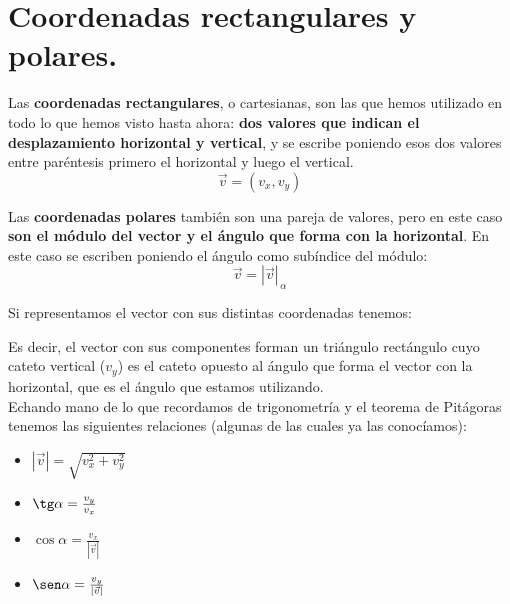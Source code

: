 \documentclass[a4paper,11pt,answers]{exam}
\begin{document}
\section{Coordenadas rectangulares y polares.}
Las \textbf{coordenadas rectangulares}, o cartesianas, son las que hemos utilizado en todo lo que hemos
visto hasta ahora: \textbf{dos valores que indican el desplazamiento horizontal y vertical}, y se
escribe poniendo esos dos valores entre paréntesis primero el horizontal y luego el vertical.
\[\vec{v} = (v_x, v_y)\]

Las \textbf{coordenadas polares} también son una pareja de valores, pero en este caso
\textbf{son el módulo del vector y el ángulo que forma con la horizontal}. En este caso se escriben
poniendo el ángulo como subíndice del módulo:
\Large{\[\vec{v} = |\vec{v}|_{\,\alpha}\]}

Si representamos el vector con sus distintas coordenadas tenemos:
\begin{center}
\end{center}
Es decir, el vector con sus componentes forman un triángulo rectángulo cuyo cateto vertical ($v_y$)
es el cateto opuesto al ángulo que forma el vector con la horizontal, que es el ángulo que estamos
utilizando.\\
Echando mano de lo que recordamos de trigonometría y el teorema de Pitágoras tenemos las siguientes
relaciones (algunas de las cuales ya las conocíamos):
\begin{itemize}
\item $|\vec{v}| = \sqrt{v_x^2 + v_y^2}$
\item $\tg \alpha = \frac{v_y}{v_x}$
\item $\cos \alpha = \frac{v_x}{|\vec{v}|}$
\item $\sen \alpha = \frac{v_y}{|\vec{v}|}$
\end{itemize}
\end{document}
